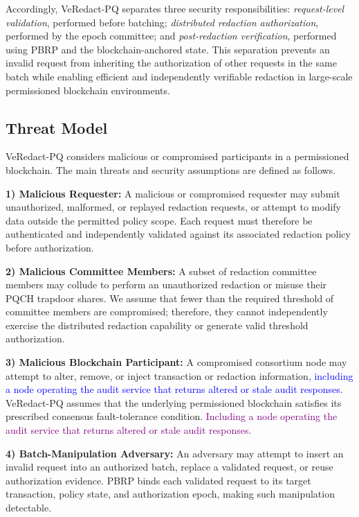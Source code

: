 \documentclass[lettersize,journal]{IEEEtran}
\begin{document}
Accordingly, VeRedact-PQ separates three security responsibilities:
\emph{request-level validation}, performed before batching;
\emph{distributed redaction authorization}, performed by the epoch
committee; and \emph{post-redaction verification}, performed using
PBRP and the blockchain-anchored state. This separation prevents an
invalid request from inheriting the authorization of other requests in
the same batch while enabling efficient and independently verifiable
redaction in large-scale permissioned blockchain environments.



\subsection{Threat Model}

VeRedact-PQ considers malicious or compromised participants in a
permissioned blockchain. The main threats and security assumptions are
defined as follows.

\textbf{1) Malicious Requester:}
A malicious or compromised requester may submit unauthorized,
malformed, or replayed redaction requests, or attempt to modify data
outside the permitted policy scope. Each request must therefore be
authenticated and independently validated against its associated
redaction policy before authorization.

\textbf{2) Malicious Committee Members:}
A subset of redaction committee members may collude to perform an
unauthorized redaction or misuse their PQCH trapdoor shares. We assume
that fewer than the required threshold of committee members are
compromised; therefore, they cannot independently exercise the
distributed redaction capability or generate valid threshold
authorization.

\textbf{3) Malicious Blockchain Participant:}
A compromised consortium node may attempt to alter, remove, or inject
transaction or redaction information\textcolor{blue}{, including a node operating the audit service that returns
altered or stale audit responses}. VeRedact-PQ assumes that the
underlying permissioned blockchain satisfies its prescribed consensus
fault-tolerance condition.\textcolor{purple}{ Including a node operating the audit service that returns
altered or stale audit responses.} 

\textbf{4) Batch-Manipulation Adversary:}
An adversary may attempt to insert an invalid request into an authorized
batch, replace a validated request, or reuse authorization evidence.
PBRP binds each validated request to its target transaction, policy
state, and authorization epoch, making such manipulation detectable.
\end{document}
